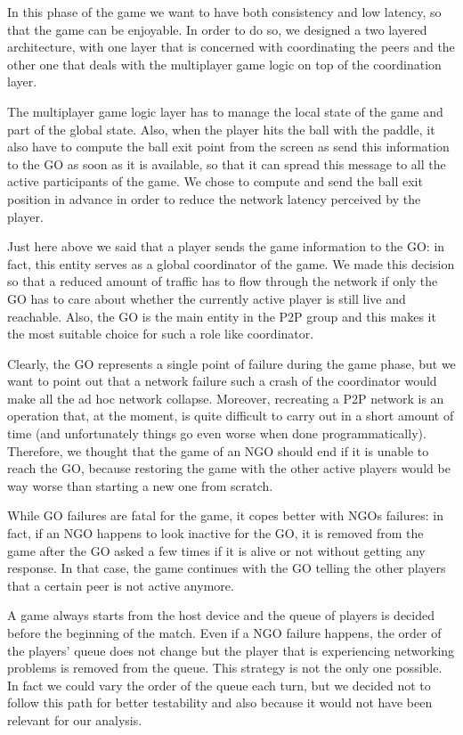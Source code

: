 In this phase of the game we want to have both consistency and low latency, so
that the game can be enjoyable. In order to do so, we designed a two layered
architecture, with one layer that is concerned with coordinating the peers and
the other one that deals with the multiplayer game logic on top of the
coordination layer.

The multiplayer game logic layer has to manage the local state of the game and
part of the global state. Also, when the player hits the ball with the paddle,
it also have to compute the ball exit point from the screen as send this
information to the GO as soon as it is available, so that it can spread this
message to all the active participants of the game. We chose to compute and
send the ball exit position in advance in order to reduce the network latency
perceived by the player.

Just here above we said that a player sends the game information to the GO:
in fact, this entity serves as a global coordinator of the game. We made this
decision so that a reduced amount of traffic has to flow through the network
if only the GO has to care about whether the currently active player is still
live and reachable. Also, the GO is the main entity in the P2P group and this
makes it the most suitable choice for such a role like coordinator.

Clearly, the GO represents a single point of failure during the game phase, but
we want to point out that a network failure such a crash of the coordinator
would make all the ad hoc network collapse. Moreover, recreating a P2P network
is an operation that, at the moment, is quite difficult to carry out in a
short amount of time (and unfortunately things go even worse when done
programmatically). Therefore, we thought that the game of an NGO should end if
it is unable to reach the GO, because restoring the game with the other active
players would be way worse than starting a new one from scratch.

While GO failures are fatal for the game, it copes better with NGOs failures:
in fact, if an NGO happens to look inactive for the GO, it is removed from the
game after the GO asked a few times if it is alive or not without getting any
response. In that case, the game continues with the GO telling the other
players that a certain peer is not active anymore.

A game always starts from the host device and the queue of players is decided
before the beginning of the match. Even if a NGO failure happens, the order of
the players' queue does not change but the player that is experiencing
networking problems is removed from the queue.
This strategy is not the only one possible.
In fact we could vary the order of the queue each turn, but we decided
not to follow this path for better testability and also because it would not
have been relevant for our analysis.
